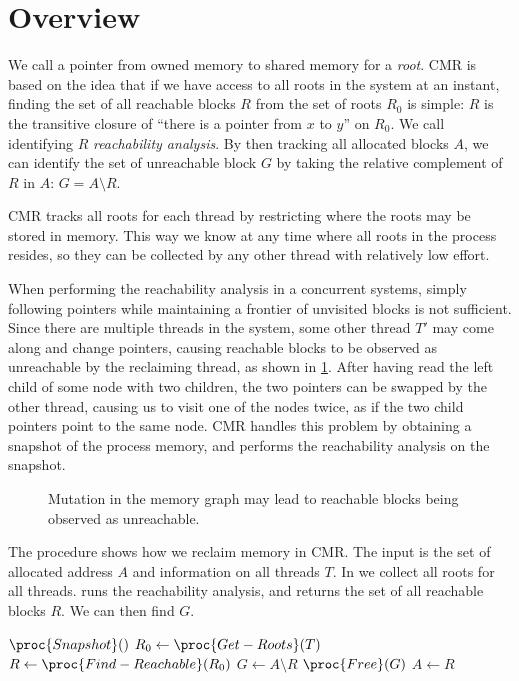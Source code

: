 \section{Overview\label{sec:cmr-overview}}

We call a pointer from owned memory to shared memory for a \emph{root}.  CMR is based on the idea
that if we have access to all roots in the system at an instant, finding the set of all reachable
blocks $R$ from the set of roots $R_0$ is simple: $R$ is the transitive closure of ``there is a
pointer from $x$ to $y$'' on $R_0$.  We call identifying $R$ \emph{reachability analysis}. By
then tracking all allocated blocks $A$, we can identify the set of unreachable block $G$ by taking
the relative complement of $R$ in $A$: $G = A \setminus R$.

CMR tracks all roots for each thread by restricting where the roots may be stored in memory. This
way we know at any time where all roots in the process resides, so they can be collected by any
other thread with relatively low effort.


When performing the reachability analysis in a concurrent systems, simply following pointers while
maintaining a frontier of unvisited blocks is not sufficient. Since there are multiple threads in
the system, some other thread $T'$ may come along and change pointers, causing reachable blocks to
be observed as unreachable by the reclaiming thread, as shown in \cref{fig:pointer-swap}. After
having read the left child of some node with two children, the two pointers can be swapped by the
other thread, causing us to visit one of the nodes twice, as if the two child pointers point to the
same node. CMR handles this problem by obtaining a snapshot of the process memory, and performs
the reachability analysis on the snapshot.

\begin{figure}[ht]
  \centering
  
  \caption{Mutation in the memory graph may lead to reachable blocks being observed as
  unreachable.\label{fig:pointer-swap}}
\end{figure}


The  procedure shows how we reclaim memory in CMR\@. The input is the set of
allocated address $A$ and information on all threads $T$. In  we collect all roots
for all threads.  runs the reachability analysis, and returns the set of all
reachable blocks $R$. We can then find $G$.

\begin{codebox}
\li $\proc{Snapshot}()$
\li $R_0 \gets \proc{Get-Roots}(T)$
\li $R \gets \proc{Find-Reachable}(R_0)$
\li $G \gets A \setminus R$
\li $\proc{Free}(G)$
\li $A \gets R$
\end{codebox}

